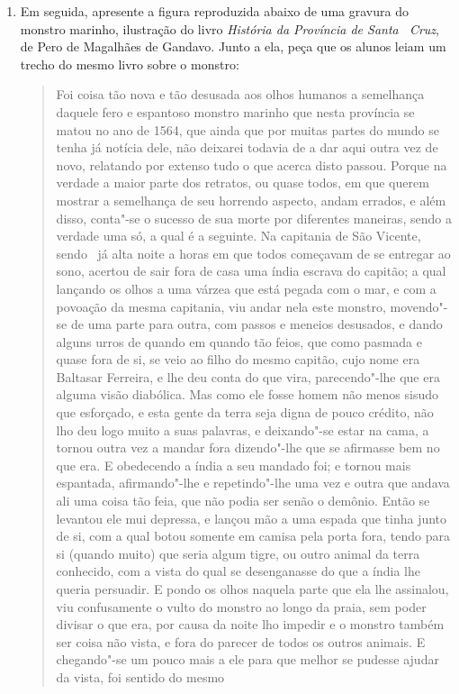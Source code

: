 \documentclass[12pt]{extarticle}
\begin{document}
{\begin{enumerate}
\item Em seguida, apresente a figura reproduzida abaixo de uma gravura do 
monstro marinho, ilustração do livro \emph{História da Província de Santa~
Cruz}, de Pero de Magalhães de Gandavo. Junto a ela, peça que os alunos 
leiam um trecho do mesmo livro sobre o monstro:
\begin{quote} Foi coisa tão nova e tão desusada aos olhos humanos a 
semelhança daquele fero e espantoso monstro marinho que nesta província 
se matou no ano de 1564, que ainda que por muitas partes do mundo se 
tenha já notícia dele, não deixarei todavia de a dar aqui outra vez de 
novo, relatando por extenso tudo o que acerca disto passou. Porque na 
verdade a maior parte dos retratos, ou quase todos, em que querem mostrar 
a semelhança de seu horrendo aspecto, andam errados, e além disso,
conta"-se o sucesso de sua morte por diferentes maneiras, sendo a
verdade uma só, a qual é a seguinte. Na capitania de São Vicente, sendo				\
já alta noite a horas em que todos começavam de se entregar ao sono,
acertou de sair fora de casa uma índia escrava do capitão; a qual
lançando os olhos a uma várzea que está pegada com o mar, e com a
povoação da mesma capitania, viu andar nela este monstro, movendo"-se de
uma parte para outra, com passos e meneios desusados, e dando alguns urros
de quando em quando tão feios, que como pasmada e quase fora de si, se
veio ao filho do mesmo capitão, cujo nome era Baltasar Ferreira, e lhe
deu conta do que vira, parecendo"-lhe que era alguma visão diabólica.
Mas como ele fosse homem não menos sisudo que esforçado, e esta gente
da terra seja digna de pouco crédito, não lho deu logo muito a suas
palavras, e deixando"-se estar na cama, a tornou outra vez a mandar
fora dizendo"-lhe que se afirmasse bem no que era. E obedecendo a índia
a seu mandado foi; e tornou mais espantada, afirmando"-lhe e
repetindo"-lhe uma vez e outra que andava ali uma coisa tão feia, que não
podia ser senão o demônio. Então se levantou ele mui depressa, e
lançou mão a uma espada que tinha junto de si, com a qual botou somente
em camisa pela porta fora, tendo para si (quando muito) que seria algum
tigre, ou outro animal da terra conhecido, com a vista do qual se
desenganasse do que a índia lhe queria persuadir. E pondo os olhos
naquela parte que ela lhe assinalou, viu confusamente o vulto do
monstro ao longo da praia, sem poder divisar o que era, por causa da
noite lho impedir e o monstro também ser coisa não vista, e fora do
parecer de todos os outros animais. E chegando"-se um pouco mais a ele
para que melhor se pudesse ajudar da vista, foi sentido do mesmo

\end{quote}
\end{enumerate}}
\end{document}
